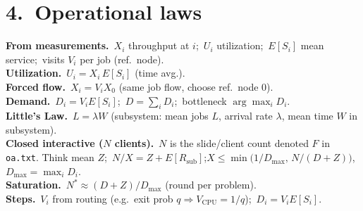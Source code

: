 \section*{4.\ Operational laws}
\textbf{From measurements.}\ $X_i$ throughput at $i$;\ $U_i$ utilization;\ $E[S_i]$ mean service;\ visits $V_i$ per job (ref.\ node).\\
\textbf{Utilization.}\ $U_i=X_i\,E[S_i]$ (time avg.).\\
\textbf{Forced flow.}\ $X_i=V_i X_0$ (same job flow, choose ref.\ node $0$).\\
\textbf{Demand.}\ $D_i=V_i E[S_i]$;\ $D=\sum_i D_i$;\ bottleneck $\arg\max_i D_i$.\\
\textbf{Little's Law.}\ $L=\lambda W$ (subsystem: mean jobs $L$, arrival rate $\lambda$, mean time $W$ in subsystem).\\
\textbf{Closed interactive ($N$ clients).}\ $N$ is the slide/client count denoted $F$ in \texttt{oa.txt}. Think mean $Z$;\ $N/X=Z+E[R_{\mathrm{sub}}]$;\quad $X\le\min\bigl(1/D_{\max},\,N/(D+Z)\bigr)$,\ $D_{\max}=\max_i D_i$.\\
\textbf{Saturation.}\ $N^\ast\approx(D+Z)/D_{\max}$ (round per problem).\\
\textbf{Steps.}\ $V_i$ from routing (e.g.\ exit prob $q\Rightarrow V_{\mathrm{CPU}}=1/q$);\ $D_i=V_iE[S_i]$.
